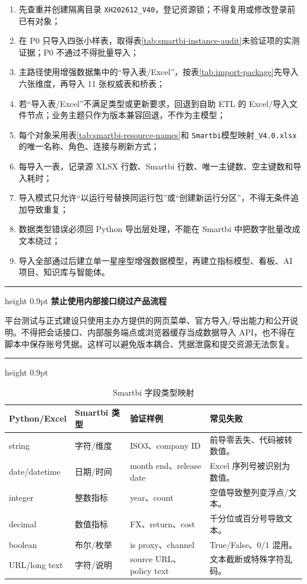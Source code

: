 \documentclass[UTF8,fontset=windows,12pt,openany]{ctexbook}
\newenvironment{warningbox}[1][]{%
  \par\medskip\noindent\begin{center}\begin{minipage}{0.93\textwidth}%
  \color{TextGray}\hrule height 0.9pt\vspace{0.45em}%
  \textbf{#1}\par\smallskip\color{black}%
}{%
  \par\vspace{0.35em}\color{TextGray}\hrule height 0.9pt%
  \end{minipage}\end{center}\medskip%
}
\newcommand{\Field}[1]{{\small\nolinkurl{#1}}}
\newcommand{\File}[1]{{\small\nolinkurl{#1}}}
\begin{document}
\begin{enumerate}
  \item 先查重并创建隔离目录 \Field{XH202612_V40}，登记资源锁；不得复用或修改登录前已有对象；
  \item 在 P0 只导入四张小样表，取得表\ref{tab:smartbi-instance-audit}未验证项的实测证据；P0 不通过不得批量导入；
  \item 主路径使用增强数据集中的“导入表/Excel”，按表\ref{tab:import-package}先导入六张维度，再导入 11 张权威表和桥表；
  \item 若“导入表/Excel”不满足类型或更新要求，回退到自助 ETL 的 Excel/导入文件节点；业务主题只作为版本兼容回退，不作为主模型；
  \item 每个对象采用表\ref{tab:smartbi-resource-names}和 \File{Smartbi}\textsf{模型映射}\File{_V4.0.xlsx}的唯一名称、角色、连接与刷新方式；
  \item 每导入一表，记录源 XLSX 行数、Smartbi 行数、唯一主键数、空主键数和导入耗时；
  \item 导入模式只允许“以运行号替换同运行包”或“创建新运行分区”，不得无条件追加导致重复；
  \item 数据类型错误必须回 Python 导出层处理，不能在 Smartbi 中把数字批量改成文本绕过；
  \item 导入全部通过后建立单一星座型增强数据模型，再建立指标模型、看板、AI 项目、知识库与智能体。
\end{enumerate}

\begin{warningbox}[禁止使用内部接口绕过产品流程]
平台测试与正式建设只使用主办方提供的网页菜单、官方导入/导出能力和公开说明。不得把会话接口、内部服务端点或浏览器缓存当成数据导入 API，也不得在脚本中保存账号凭据。这样可以避免版本耦合、凭据泄露和提交资源无法恢复。
\end{warningbox}

\begin{longtable}{p{3.3cm}p{3.6cm}p{3.2cm}p{3.7cm}}
\caption{Smartbi 字段类型映射}\label{tab:smartbi-types}\\
\toprule
\textbf{Python/Excel} & \textbf{Smartbi 类型} & \textbf{验证样例} & \textbf{常见失败}\\
\midrule
string & 字符/维度 & ISO3、company ID & 前导零丢失、代码被转数值。\\
date/datetime & 日期/时间 & month end、release date & Excel 序列号被识别为数值。\\
integer & 整数指标 & year、count & 空值导致整列变浮点/文本。\\
decimal & 数值指标 & FX、return、cost & 千分位或百分号导致文本。\\
boolean & 布尔/枚举 & is proxy、channel & True/False、0/1 混用。\\
URL/long text & 字符/说明 & source URL、policy text & 文本截断或特殊字符乱码。\\
\bottomrule
\end{longtable}
\end{document}
